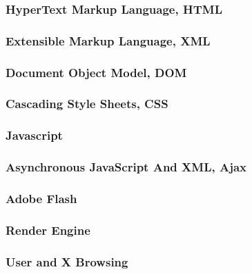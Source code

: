 \subsubsection{HyperText Markup Language, HTML}
\label{sec:chap2.1.2.1}


\subsubsection{Extensible Markup Language, XML}
\label{sec:chap2.1.2.2}


\subsubsection{Document Object Model, DOM}
\label{sec:chap2.1.2.3}


\subsubsection{Cascading Style Sheets, CSS}
\label{sec:chap2.1.2.4}


\subsubsection{Javascript}
\label{sec:chap2.1.2.5}


\subsubsection{Asynchronous JavaScript And XML, Ajax}
\label{sec:chap2.1.2.6}


\subsubsection{Adobe Flash}
\label{sec:chap2.1.2.7}


\subsubsection{Render Engine}
\label{sec:chap2.1.2.8}


\subsubsection{User and X Browsing}
\label{sec:chap2.1.2.9}



